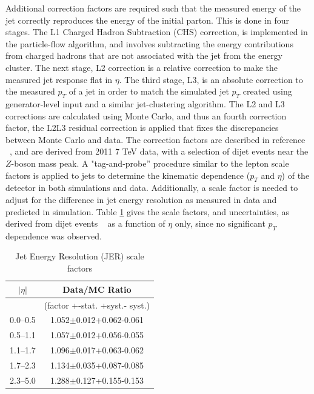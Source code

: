 \par Additional correction factors are required such that the measured
energy of the jet correctly reproduces the energy of the initial
parton.  This is done in four stages.  The L1 Charged Hadron
Subtraction (CHS) correction, is implemented in the particle-flow
algorithm, and involves subtracting the energy contributions from
charged hadrons that are not associated with the jet from the energy
cluster.  The next stage, L2 correction is a relative correction to
make the measured jet response flat in $\eta$.  The third stage, L3,
is an absolute correction to the measured $p_T$ of a jet in order to
match the simulated jet $p_{T}$ created using generator-level input
and a similar jet-clustering algorithm. The L2 and L3 corrections are
calculated using Monte Carlo, and thus an fourth correction factor,
the L2L3 residual correction is applied that fixes the discrepancies
between Monte Carlo and data.  The correction factors are described in
reference ~\cite{CMS:2011esa}, and are derived from 2011 7 TeV data,
with a selection of dijet events near the $Z$-boson mass peak.  A
"tag-and-probe'' procedure similar to the lepton scale factors is
applied to jets to determine the kinematic dependence ($p_{T}$ and
$\eta$) of the detector in both simulations and data.  Additionally, a
scale factor is needed to adjust for the difference in jet energy
resolution as measured in data and predicted in simulation.  Table
\ref{tab:JERtable} gives the scale factors, and uncertainties, as
derived from dijet events ~\cite{CMS:2011esa} as a function of $\eta$
only, since no significant $p_{T}$ dependence was observed.  

\begin{table}
\centering
\begin{tabular}{|c|c|}
\hline\hline
$|\eta|$ & Data/MC Ratio \\ \hline
 & (factor +-stat. +syst.- syst.) \\ \hline
0.0–0.5 & 1.052$\pm$0.012+0.062-0.061 \\
0.5–1.1 & 1.057$\pm$0.012+0.056-0.055 \\
1.1–1.7 & 1.096$\pm$0.017+0.063-0.062 \\
1.7–2.3 & 1.134$\pm$0.035+0.087-0.085 \\
2.3–5.0 & 1.288$\pm$0.127+0.155-0.153 \\
\hline\hline
\end{tabular}
\caption{Jet Energy Resolution (JER) scale factors}
\label{tab:JERtable}
\end{table} 

